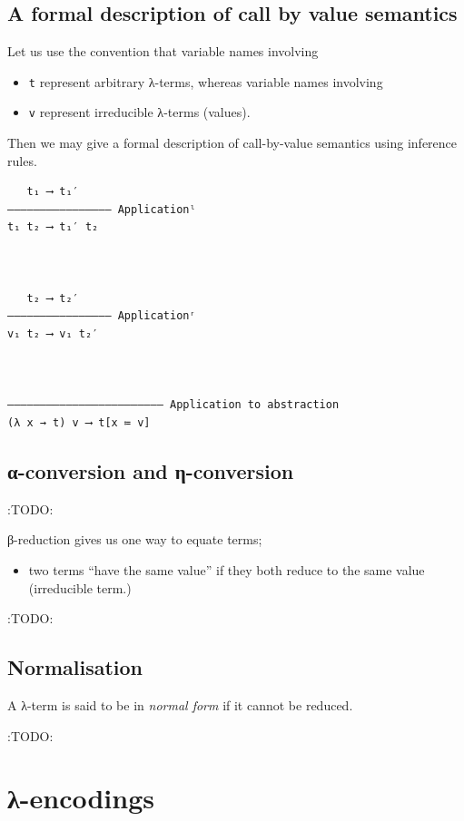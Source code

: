 \documentclass[11pt]{article}
\theoremstyle{definition}
\begin{document}
\subsection{A formal description of call by value semantics}
\label{sec:org9333882}

Let us use the convention that variable names involving
\begin{itemize}
\item \texttt{t} represent arbitrary λ-terms, whereas variable names involving
\item \texttt{v} represent irreducible λ-terms (values).
\end{itemize}

Then we may give a formal description of call-by-value semantics
using inference rules.
\begin{verbatim}
   t₁ ⟶ t₁′
–––––––––––––––– Applicationˡ
t₁ t₂ ⟶ t₁′ t₂


   
   t₂ ⟶ t₂′
–––––––––––––––– Applicationʳ
v₁ t₂ ⟶ v₁ t₂′


   
–––––––––––––––––––––––– Application to abstraction
(λ x → t) v ⟶ t[x ≔ v]
\end{verbatim}

\subsection{α-conversion and η-conversion}
\label{sec:orgdbbde08}
:TODO:


β-reduction gives us one way to equate terms;
\begin{itemize}
\item two terms “have the same value” if they both reduce to the same
value (irreducible term.)
\end{itemize}

:TODO:

\subsection{Normalisation}
\label{sec:orgcc4b1bf}

A λ-term is said to be in \emph{normal form} if it cannot be reduced.

:TODO:

\section{λ-encodings}
\label{sec:org477c1c8}
\end{document}
